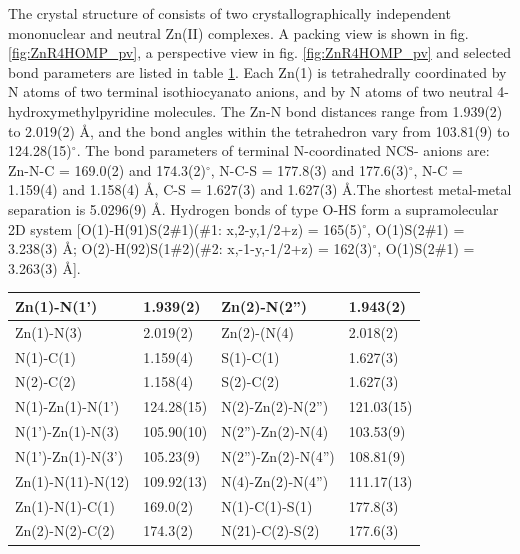 The crystal structure of  consists of two crystallographically independent mononuclear and neutral Zn(II) complexes. A  packing view is shown in fig. \ref{fig:ZnR4HOMP_pv}, a perspective view in fig. \ref{fig:ZnR4HOMP_pv} and selected bond parameters are listed in table \ref{batab:ZnR4HOMP}. Each Zn(1) is tetrahedrally coordinated by N atoms of two terminal isothiocyanato anions, and by N atoms of two neutral 4-hydroxymethylpyridine molecules. The Zn-N bond distances range from 1.939(2) to 2.019(2) \AA, and the bond angles within the  tetrahedron vary from 103.81(9) to 124.28(15)$^\circ$. The bond parameters of terminal N-coordinated NCS- anions are: Zn-N-C = 169.0(2) and 174.3(2)$^\circ$, N-C-S = 177.8(3) and 177.6(3)$^\circ$, N-C = 1.159(4) and 1.158(4) \AA, C-S = 1.627(3) and 1.627(3) \AA.The shortest metal-metal separation is 5.0296(9) \AA. Hydrogen bonds of type O-H\ce{***}S form a supramolecular 2D system [O(1)-H(91)\ce{***}S(2\#1)(\#1: x,2-y,1/2+z) = 165(5)$^\circ$, O(1)\ce{***}S(2\#1) = 3.238(3) \AA; O(2)-H(92)\ce{***}S(1\#2)(\#2: x,-1-y,-1/2+z) = 162(3)$^\circ$, O(1)\ce{***}S(2\#1) = 3.263(3) \AA].




\begin{table}[htpb!]
\centering
{}
\begin{tabular}{|l|l|l|l|}
\hline
Zn(1)-N(1') & 1.939(2) & Zn(2)-N(2'') & 1.943(2)\\
\hline
Zn(1)-N(3) & 2.019(2) & Zn(2)-(N(4) & 2.018(2)\\
\hline
N(1)-C(1) & 1.159(4)& S(1)-C(1) & 1.627(3)\\
\hline
N(2)-C(2) & 1.158(4) & S(2)-C(2) & 1.627(3)\\
\hline
\hline
N(1)-Zn(1)-N(1') & 124.28(15) & N(2)-Zn(2)-N(2'') & 121.03(15)\\
\hline
N(1')-Zn(1)-N(3) & 105.90(10) & N(2'')-Zn(2)-N(4) & 103.53(9)\\
\hline
N(1')-Zn(1)-N(3') & 105.23(9) & N(2'')-Zn(2)-N(4'') & 108.81(9)\\
\hline
Zn(1)-N(11)-N(12) & 109.92(13) & N(4)-Zn(2)-N(4'') & 111.17(13)\\
\hline
Zn(1)-N(1)-C(1) & 169.0(2) & N(1)-C(1)-S(1) & 177.8(3)\\
\hline
Zn(2)-N(2)-C(2) & 174.3(2) & N(21)-C(2)-S(2) & 177.6(3)\\
\hline
\end{tabular}

\label{batab:ZnR4HOMP}
\end{table}




